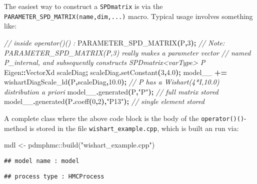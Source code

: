 \documentclass[
]{book}
\newenvironment{Shaded}{\begin{snugshade}}{\end{snugshade}}
\newcommand{\CommentTok}[1]{\textcolor[rgb]{0.56,0.35,0.01}{\textit{#1}}}
\newcommand{\DecValTok}[1]{\textcolor[rgb]{0.00,0.00,0.81}{#1}}
\newcommand{\FloatTok}[1]{\textcolor[rgb]{0.00,0.00,0.81}{#1}}
\newcommand{\FunctionTok}[1]{\textcolor[rgb]{0.00,0.00,0.00}{#1}}
\newcommand{\NormalTok}[1]{#1}
\newcommand{\OperatorTok}[1]{\textcolor[rgb]{0.81,0.36,0.00}{\textbf{#1}}}
\newcommand{\OtherTok}[1]{\textcolor[rgb]{0.56,0.35,0.01}{#1}}
\newcommand{\SpecialCharTok}[1]{\textcolor[rgb]{0.00,0.00,0.00}{#1}}
\newcommand{\StringTok}[1]{\textcolor[rgb]{0.31,0.60,0.02}{#1}}
\begin{document}
The easiest way to construct a \texttt{SPDmatrix} is via the \texttt{PARAMETER\_SPD\_MATRIX(name,dim,...)} macro. Typical usage involves something like:

\begin{Shaded}
\begin{Highlighting}[]
\CommentTok{// inside operator()() : }
\NormalTok{PARAMETER\_SPD\_MATRIX}\OperatorTok{(}\NormalTok{P}\OperatorTok{,}\DecValTok{3}\OperatorTok{);} 
\CommentTok{// Note: PARAMETER\_SPD\_MATRIX(P,3) really makes a parameter vector  }
\CommentTok{// named P\_internal, and subsequently constructs SPDmatrix\textless{}varType\textgreater{} P}
\NormalTok{Eigen}\OperatorTok{::}\NormalTok{VectorXd scaleDiag}\OperatorTok{;}\NormalTok{ scaleDiag}\OperatorTok{.}\NormalTok{setConstant}\OperatorTok{(}\DecValTok{3}\OperatorTok{,}\FloatTok{4.0}\OperatorTok{);}
\NormalTok{model\_\_ }\OperatorTok{+=}\NormalTok{ wishartDiagScale\_ld}\OperatorTok{(}\NormalTok{P}\OperatorTok{,}\NormalTok{scaleDiag}\OperatorTok{,}\FloatTok{10.0}\OperatorTok{);} 
\CommentTok{// P has a Wishart(4*I,10.0) distribution a priori }
\NormalTok{model\_\_}\OperatorTok{.}\NormalTok{generated}\OperatorTok{(}\NormalTok{P}\OperatorTok{,}\StringTok{"P"}\OperatorTok{);} \CommentTok{// full matrix stored}
\NormalTok{model\_\_}\OperatorTok{.}\NormalTok{generated}\OperatorTok{(}\NormalTok{P}\OperatorTok{.}\NormalTok{coeff}\OperatorTok{(}\DecValTok{0}\OperatorTok{,}\DecValTok{2}\OperatorTok{),}\StringTok{"P13"}\OperatorTok{);} \CommentTok{// single element stored}
\end{Highlighting}
\end{Shaded}

A complete class where the above code block is the body of the \texttt{operator()()}-method is stored in the file \texttt{wishart\_example.cpp}, which is built an run via:

\begin{Shaded}
\begin{Highlighting}[]
\NormalTok{mdl }\OtherTok{\textless{}{-}}\NormalTok{ pdmphmc}\SpecialCharTok{::}\FunctionTok{build}\NormalTok{(}\StringTok{"wishart\_example.cpp"}\NormalTok{)}
\end{Highlighting}
\end{Shaded}

\begin{verbatim}
## model name : model
\end{verbatim}

\begin{verbatim}
## process type : HMCProcess
\end{verbatim}
\end{document}
